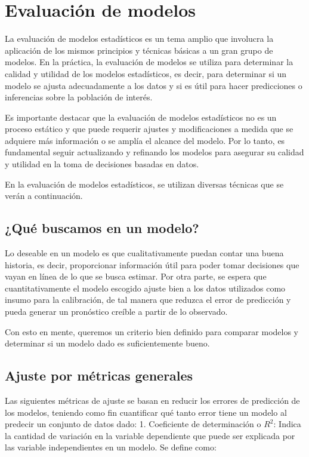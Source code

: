 \documentclass[
]{book}
\begin{document}
\section{Evaluación de modelos}\label{evaluaciuxf3n-de-modelos}

La evaluación de modelos estadísticos es un tema amplio que involucra la
aplicación de los mismos principios y técnicas básicas a un gran grupo
de modelos. En la práctica, la evaluación de modelos se utiliza para
determinar la calidad y utilidad de los modelos estadísticos, es decir,
para determinar si un modelo se ajusta adecuadamente a los datos y si es
útil para hacer predicciones o inferencias sobre la población de
interés.

Es importante destacar que la evaluación de modelos estadísticos no es
un proceso estático y que puede requerir ajustes y modificaciones a
medida que se adquiere más información o se amplía el alcance del
modelo. Por lo tanto, es fundamental seguir actualizando y refinando los
modelos para asegurar su calidad y utilidad en la toma de decisiones
basadas en datos.

En la evaluación de modelos estadísticos, se utilizan diversas técnicas
que se verán a continuación.

\subsection{¿Qué buscamos en un modelo?}\label{quuxe9-buscamos-en-un-modelo}

Lo deseable en un modelo es que cualitativamente puedan contar una buena
historia, es decir, proporcionar información útil para poder tomar
decisiones que vayan en línea de lo que se busca estimar. Por otra
parte, se espera que cuantitativamente el modelo escogido ajuste bien a
los datos utilizados como insumo para la calibración, de tal manera que
reduzca el error de predicción y pueda generar un pronóstico creíble a
partir de lo observado.

Con esto en mente, queremos un criterio bien definido para comparar
modelos y determinar si un modelo dado es suficientemente bueno.

\subsection{Ajuste por métricas generales}\label{ajuste-por-muxe9tricas-generales}

Las siguientes métricas de ajuste se basan en reducir los errores de
predicción de los modelos, teniendo como fin cuantificar qué tanto error
tiene un modelo al predecir un conjunto de datos dado: 1. Coeficiente de
determinación o \(R^2\): Indica la cantidad de variación en la variable
dependiente que puede ser explicada por las variable independientes en
un modelo. Se define como:
\end{document}
